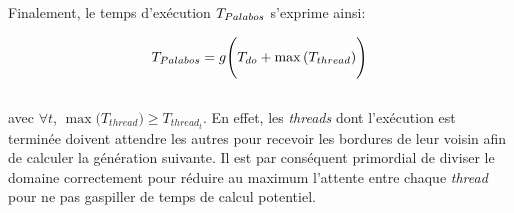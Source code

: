 Finalement, le temps d'exécution $T_{Palabos}$ s'exprime ainsi:

\begin{equation}
T_{Palabos} =   g \Bigg(T_{do} + \max{(T_{thread}}) \Bigg)
\end{equation}\\[-\baselineskip]

avec $\forall t$,  $\max{(T_{thread}}) \ge T_{thread_t}$. En effet, les \textit{threads} dont l'exécution est terminée doivent attendre les autres pour recevoir les bordures de leur voisin afin de calculer la génération suivante. Il est par conséquent primordial de diviser le domaine correctement pour réduire au maximum l'attente entre chaque \textit{thread} pour ne pas gaspiller de temps de calcul potentiel.